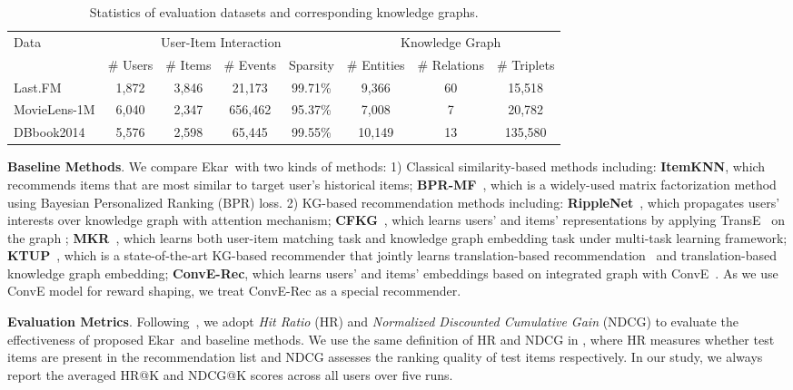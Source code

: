 \documentclass{article}
\newcommand{\name}{Ekar}
\newcommand{\xhdr}[1]{{\noindent\bfseries #1}.}
\begin{document}
\begin{table}[]
\caption{Statistics of evaluation datasets and corresponding knowledge graphs.}
\centering
\scalebox{0.98}
{
\begin{tabular}{lccccccc} 
\toprule
\multirow{2}{*}{Data} & \multicolumn{4}{c}{User-Item Interaction} & \multicolumn{3}{c}{Knowledge Graph}\\\cmidrule(r{1em}l{1em}){2-5}\cmidrule(r{1em}l{1em}){6-8}
    & \# Users & \# Items & \# Events & Sparsity & \# Entities & \# Relations & \# Triplets  \\
\midrule
Last.FM & 1,872 & 3,846 & 21,173 & 99.71\% & 9,366 & 60 & 15,518 \\
MovieLens-1M & 6,040 & 2,347 & 656,462 & 95.37\% & 7,008 & 7 & 20,782 \\
DBbook2014 & 5,576 & 2,598 & 65,445 & 99.55\% & 10,149 & 13 & 135,580 \\
\bottomrule
\end{tabular}\label{tab::dataset}
}
\end{table}


\xhdr{Baseline Methods} 
We compare \name\ with two kinds of methods: 
1) Classical similarity-based methods including:  
\textbf{ItemKNN}, which recommends items that are most similar to target user's historical items; 
\textbf{BPR-MF}~\cite{yu2014personalized}, which is a widely-used matrix factorization method using Bayesian Personalized Ranking (BPR) loss. 
2) KG-based recommendation methods including: 
\textbf{RippleNet}~\cite{wang2018ripplenet}, which propagates users' interests over knowledge graph with attention mechanism;  
\textbf{CFKG}~\cite{zhang2018learning}, which learns users' and items' representations by applying TransE~\cite{bordes2013translating} on the graph ; 
\textbf{MKR}~\cite{Wang_2019}, which learns both user-item matching task and knowledge graph embedding task under multi-task learning framework; 
\textbf{KTUP}~\cite{Cao_2019}, which is a state-of-the-art KG-based recommender that jointly learns translation-based recommendation~\cite{he2017translation} and translation-based knowledge graph embedding;
\textbf{ConvE-Rec}, which learns users' and items' embeddings based on integrated graph  with ConvE~\cite{dettmers2018convolutional}. As we use ConvE model for reward shaping, we treat ConvE-Rec as a special recommender.  


\xhdr{Evaluation Metrics} Following~\cite{Cao_2019,he2015trirank,song2019session}, we adopt \textit{Hit Ratio} (HR) and \textit{Normalized Discounted Cumulative Gain} (NDCG) to evaluate the effectiveness of proposed \name\ and baseline methods. We use the same definition of HR and NDCG in \cite{he2015trirank}, where HR measures whether test items are present in the recommendation list and NDCG assesses the ranking quality of test items respectively.
In our study, we always report the averaged HR@K and NDCG@K scores across all users over five runs.
\end{document}
